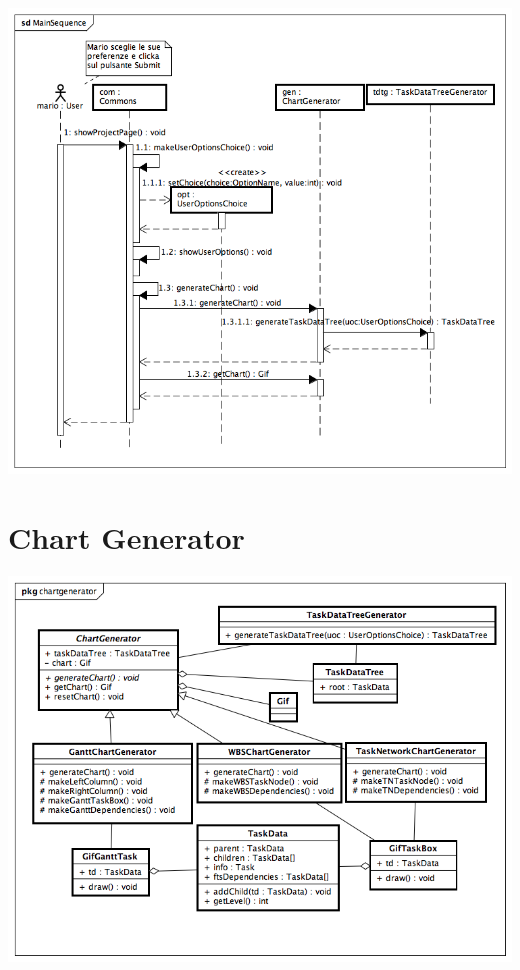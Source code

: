 \documentclass[a4paper, 12pt]{report}
\begin{document}
\includegraphics[width=\textwidth]{chart/MainSequence.png}

\section{Chart Generator}
\includegraphics[width=\textwidth]{chart/ChartGenerator.png}
\end{document}
